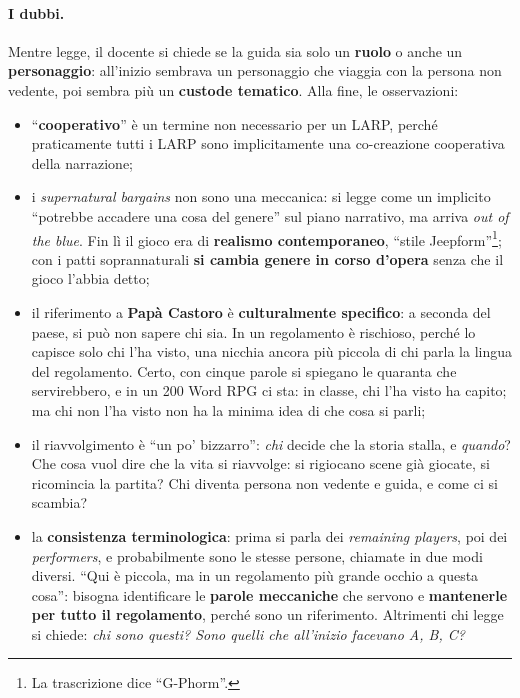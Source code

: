\paragraph{I dubbi.} Mentre legge, il docente si chiede se la guida sia solo un
\textbf{ruolo} o anche un \textbf{personaggio}: all'inizio sembrava un personaggio che
viaggia con la persona non vedente, poi sembra più un \textbf{custode tematico}. Alla
fine, le osservazioni:
\begin{itemize}
  \item ``\textbf{cooperativo}'' è un termine non necessario per un LARP, perché
        praticamente tutti i LARP sono implicitamente una co-creazione cooperativa
        della narrazione;
  \item i \emph{supernatural bargains} non sono una meccanica: si legge come un
        implicito ``potrebbe accadere una cosa del genere'' sul piano narrativo, ma
        arriva \emph{out of the blue}. Fin lì il gioco era di \textbf{realismo
        contemporaneo}, ``stile Jeepform''\footnote{La trascrizione dice
        ``G-Phorm''.}; con i patti soprannaturali \textbf{si cambia genere in corso
        d'opera} senza che il gioco l'abbia detto;
  \item il riferimento a \textbf{Papà Castoro} è \textbf{culturalmente
        specifico}: a seconda del paese, si può non sapere chi sia. In un regolamento è
        rischioso, perché lo capisce solo chi l'ha visto, una nicchia ancora più
        piccola di chi parla la lingua del regolamento. Certo, con cinque parole si
        spiegano le quaranta che servirebbero, e in un 200 Word RPG ci sta: in classe,
        chi l'ha visto ha capito; ma chi non l'ha visto non ha la minima idea di che
        cosa si parli;
  \item il riavvolgimento è ``un po' bizzarro'': \emph{chi} decide che la storia
        stalla, e \emph{quando}? Che cosa vuol dire che la vita si riavvolge: si
        rigiocano scene già giocate, si ricomincia la partita? Chi diventa persona non
        vedente e guida, e come ci si scambia?
  \item la \textbf{consistenza terminologica}: prima si parla dei
        \emph{remaining players}, poi dei \emph{performers}, e probabilmente sono le
        stesse persone, chiamate in due modi diversi. ``Qui è piccola, ma in un
        regolamento più grande occhio a questa cosa'': bisogna identificare le
        \textbf{parole meccaniche} che servono e \textbf{mantenerle per tutto il
        regolamento}, perché sono un riferimento. Altrimenti chi legge si chiede:
        \emph{chi sono questi? Sono quelli che all'inizio facevano A, B, C?}
\end{itemize}

